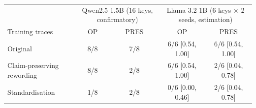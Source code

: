 \begin{tabular}{lcccc}
\toprule
 & \multicolumn{2}{c}{Qwen2.5-1.5B (16 keys, confirmatory)} & \multicolumn{2}{c}{Llama-3.2-1B (6 keys $\times$ 2 seeds, estimation)}\\
Training traces & OP & PRES & OP & PRES\\
\midrule
Original & 8/8 & 7/8 & 6/6 \scriptsize[0.54, 1.00] & 6/6 \scriptsize[0.54, 1.00]\\
Claim-preserving rewording & 8/8 & 2/8 & 6/6 \scriptsize[0.54, 1.00] & 2/6 \scriptsize[0.04, 0.78]\\
Standardisation & 1/8 & 2/8 & 0/6 \scriptsize[0.00, 0.46] & 2/6 \scriptsize[0.04, 0.78]\\
\bottomrule
\end{tabular}
